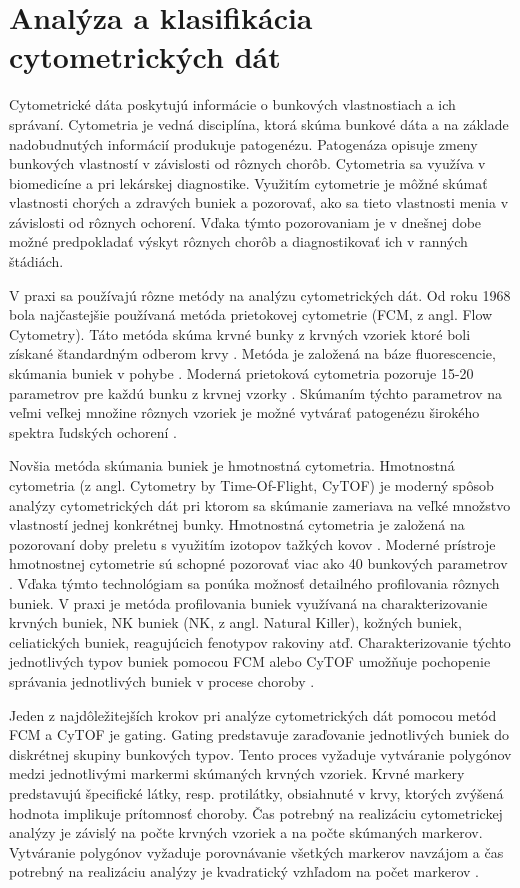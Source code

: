 \chapter{Analýza a klasifikácia cytometrických dát}
\label{DeepCyTOF_kap3}

Cytometrické dáta poskytujú informácie o bunkových vlastnostiach a ich správaní. Cytometria je vedná disciplína, ktorá skúma bunkové dáta a na základe nadobudnutých informácií produkuje patogenézu. Patogenáza opisuje zmeny bunkových vlastností v závislosti od rôznych chorôb. Cytometria sa využíva v biomedicíne a pri lekárskej diagnostike. Využitím cytometrie je môžné skúmať vlastnosti chorých a zdravých buniek a pozorovať, ako sa tieto vlastnosti menia v závislosti od rôznych ochorení. Vďaka týmto pozorovaniam je v dnešnej dobe možné predpokladať výskyt rôznych chorôb a diagnostikovať ich v ranných štádiách. 

V praxi sa používajú rôzne metódy na analýzu cytometrických dát. Od roku 1968 bola najčastejšie používaná metóda prietokovej cytometrie (FCM, z angl. Flow Cytometry). Táto metóda skúma krvné bunky z krvných vzoriek ktoré boli získané štandardným odberom krvy \cite{Li2016}. Metóda je založená na báze fluorescencie, skúmania buniek v pohybe \cite{Roubalova1934}. Moderná prietoková cytometria pozoruje 15-20 parametrov pre každú bunku z krvnej vzorky \cite{Roubalova1934}. Skúmaním týchto parametrov na veľmi veľkej množine rôznych vzoriek je možné vytvárať patogenézu širokého spektra ľudských ochorení \cite{Li2017}. 

Novšia metóda skúmania buniek je hmotnostná cytometria. Hmotnostná cytometria (z angl. Cytometry by Time-Of-Flight, CyTOF) je moderný spôsob analýzy cytometrických dát pri ktorom sa skúmanie zameriava na veľké množstvo vlastností jednej konkrétnej bunky. Hmotnostná cytometria je založená na pozorovaní doby preletu s využitím izotopov tažkých kovov \cite{Roubalova1934}. Moderné prístroje hmotnostnej cytometrie sú schopné pozorovať viac ako 40 bunkových parametrov \cite{Roubalova1934, Li2017}. Vďaka týmto technológiam sa ponúka možnosť detailného profilovania rôznych buniek. V praxi je metóda profilovania buniek využívaná na charakterizovanie krvných buniek, NK buniek (NK, z angl. Natural Killer), kožných buniek, celiatických buniek, reagujúcich fenotypov rakoviny atď. Charakterizovanie týchto jednotlivých typov buniek pomocou FCM alebo CyTOF umožňuje pochopenie správania jednotlivých buniek v procese choroby \cite{Li2016}.

Jeden z najdôležitejších krokov pri analýze cytometrických dát pomocou metód FCM a CyTOF je gating. Gating predstavuje zaraďovanie jednotlivých buniek do diskrétnej skupiny bunkových typov. Tento proces vyžaduje vytváranie polygónov medzi jednotlivými markermi skúmaných krvných vzoriek. Krvné markery predstavujú špecifické látky, resp. protilátky, obsiahnuté v krvy, ktorých zvýšená hodnota implikuje prítomnosť choroby. Čas potrebný na realizáciu cytometrickej analýzy je závislý na počte krvných vzoriek a na počte skúmaných markerov. Vytváranie polygónov vyžaduje porovnávanie všetkých markerov navzájom a čas potrebný na realizáciu analýzy je kvadratický vzhľadom na počet markerov \cite{Li2016}. 

